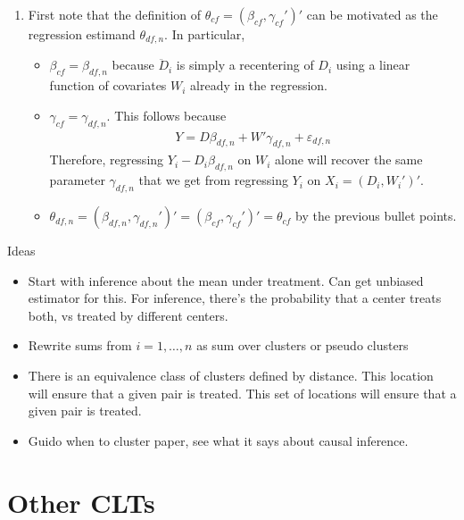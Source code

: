 \documentclass[12pt]{article}
\theoremstyle{plain}
\theoremstyle{definition}
\theoremstyle{remark}
\begin{document}
\begin{enumerate}
  \item
    First note that the definition of
    $\theta_{cf}=(\beta_{cf},\gamma_{cf}')'$ can be motivated as
    the regression estimand $\theta_{df,n}$.
    In particular,
    \begin{itemize}
      \item ${\beta}_{cf}=\beta_{df,n}$
        because $\ddot{D}_i$ is simply a recentering of $D_i$ using
        a linear function of covariates $W_i$ already in the regression.
      \item $\gamma_{cf}=\gamma_{df,n}$.
        This follows because
        \begin{align*}
          Y = D\beta_{df,n}+W'\gamma_{df,n} + \varepsilon_{df,n}
        \end{align*}
        Therefore, regressing $Y_i-D_i\beta_{df,n}$ on $W_i$ alone will
        recover the same parameter $\gamma_{df,n}$ that we get from
        regressing $Y_i$ on $X_i=(D_i,W_i')'$.
      \item
        $\theta_{df,n}=(\beta_{df,n},\gamma_{df,n}')'=(\beta_{cf},\gamma_{cf}')'=\theta_{cf}$
        by the previous bullet points.
    \end{itemize}


\end{enumerate}






\clearpage
Ideas
\begin{itemize}
  \item Start with inference about the mean under treatment.
    Can get unbiased estimator for this.
    For inference, there's the probability that a center treats both, vs
    treated by different centers.

  \item Rewrite sums from $i=1,\ldots,n$ as sum over clusters or pseudo
    clusters
  \item There is an equivalence class of clusters defined by distance.
    This location will ensure that a given pair is treated.
    This set of locations will ensure that a given pair is treated.
  \item Guido when to cluster paper, see what it says about causal
    inference.
\end{itemize}



\clearpage
\section{Other CLTs}
\end{document}
